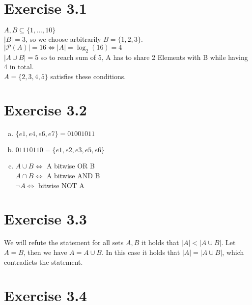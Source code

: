 \documentclass{article} %
\newcommand{\homeworkNumber}{3}
\begin{document}
\section*{Exercise \homeworkNumber.1}
$A,B \subseteq \{1,...,10\}$ \\
$\lvert B \lvert = 3$, so we choose arbitrarily $B = \{1,2,3\}$. \\
$\lvert \mathcal P(A) \lvert = 16  \iff \lvert A \lvert = \log_2(16) = 4$ \\
$\lvert A \cup B \lvert = 5$ so to reach sum of 5, A has to share 2 Elements with B while having 4 in total.\\
$A = \{2,3,4,5\}$ satisfies these conditions.




\section*{Exercise \homeworkNumber.2}

\begin{enumerate}[(a)]
	\item $\{e1,e4,e6,e7\} = 01001011$
	\item $01110110 = \{e1,e2,e3,e5,e6\}$
	\item
		$A \cup B \iff $ A bitwise OR B\\
		$A \cap B \iff $ A bitwise AND B\\
		$ \lnot A \iff $ bitwise NOT A\\


\end{enumerate}



\section*{Exercise \homeworkNumber.3}
We will refute the statement for all sets \( A,B \) it holds that \( |A| < |A \cup B| \). Let \( A = B \), then we have \( A = A \cup B \). In this case it holds that \( |A| = |A \cup B| \), which contradicts the statement.



\section*{Exercise \homeworkNumber.4}
\end{document}
